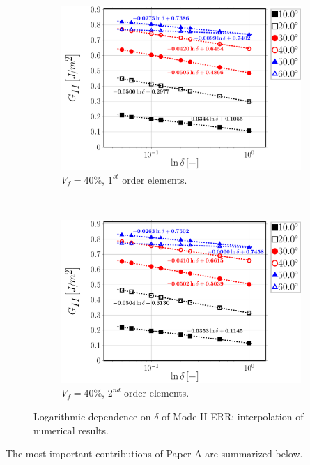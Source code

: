 \begin{figure}[!h]
    \begin{subfigure}[b]{0.45\textwidth}
        \includegraphics[width=\textwidth]{paperA/Vf40-free-1st-semilogvsDelta-GII.pdf}
       \caption{$V_{f}=40\%$, $1^{st}$ order elements.}
    \end{subfigure}
    ~
    \begin{subfigure}[b]{0.45\textwidth}
        \includegraphics[width=\textwidth]{paperA/Vf40-free-2nd-semilogvsDelta-GII.pdf}
       \caption{$V_{f}=40\%$, $2^{nd}$ order elements.}
    \end{subfigure}

\caption{Logarithmic dependence on $\delta$ of Mode II ERR: interpolation of numerical results.}\label{chap3:paperA:fig:gIIinterp}
\end{figure}

The most important contributions of Paper A are summarized below.


